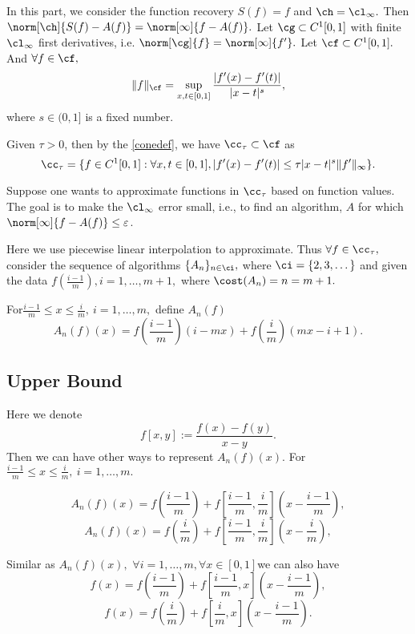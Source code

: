 
In this part, we consider the function recovery $S(f)=f$ and $\ch=\cl_{\infty}.$
Then $\norm[\ch]{S(f)-A(f)}=\norm[\infty]{f-A(f)}.$
Let $\cg \subset C^{1}[0,1]$ with finite $\cl_{\infty}$ first derivatives, i.e. $\norm[\cg]{f}=\norm[\infty]{f'}.$
Let $\cf \subset C^{1}[0,1].$ And $\forall f \in \cf,$
 $$\|f\|_{\cf}=\sup\limits_{x,t \in [0,1]}\frac{|f'(x)-f'(t)|}{|x-t|^{s}},$$ where $s \in (0,1]$ is a fixed number.


Given $\tau>0$, then by the \eqref{conedef}, we have $\cc_{\tau} \subset \cf$ as
\begin{equation}\label{ctapprox}
\cc_{\tau}=\{f \in  C^{1}[0,1] : \forall x,t \in [0,1], |f'(x)-f'(t)|\leq \tau|x-t|^{s} \|f'\|_{\infty} \}.
\end{equation}

Suppose one wants to approximate functions in $\cc_{\tau}$ based on function values.  The goal is to make the $\cl_{\infty}$ error small, i.e., to find an algorithm, $A$ for which $\norm[\infty]{f-A(f)} \le \varepsilon$.

Here we use piecewise linear interpolation to approximate. Thus $\forall f \in \cc_{\tau},$ consider the sequence of algorithms $\{A_n\}_{n \in \ci},$ where
$\ci=\{2,3,\dots\}$
 and given the data $f\left(\frac{i-1}{m}\right), i=1, \ldots,m+1,$ where $\cost(A_{n})=n=m+1.$

For$\frac{i-1}{m} \leq x \leq \frac{i}{m}, \ i=1, \ldots, m,$ define $A_{n}(f)$
$$A_{n}(f)(x)=f\left(\frac{i-1}{m}\right)(i-mx)+f\left(\frac{i}{m}\right)(mx-i+1).$$


\subsection{Upper Bound}

Here we denote
$$f[x,y]:=\frac{f(x)-f(y)}{x-y}.$$
Then we can have other ways to represent $A_{n}(f)(x).$ For $\frac{i-1}{m} \leq x \leq \frac{i}{m}, \ i=1, \ldots, m.$

$$A_{n}(f)(x)=f\left(\frac{i-1}{m}\right)+f\left[\frac{i-1}{m},\frac{i}{m}\right]\left(x-\frac{i-1}{m}\right),$$
 $$A_{n}(f)(x)=f\left(\frac{i}{m}\right)+f\left[\frac{i-1}{m},\frac{i}{m}\right]\left(x-\frac{i}{m}\right),$$

Similar as $A_{n}(f)(x),$ $\forall i=1,\ldots,m, \forall x \in [0,1]$we can also have
 $$f(x)=f\left(\frac{i-1}{m}\right)+f\left[\frac{i-1}{m},x\right]\left(x-\frac{i-1}{m}\right),$$
  $$f(x)=f\left(\frac{i}{m}\right)+f\left[\frac{i}{m},x\right]\left(x-\frac{i-1}{m}\right).$$

